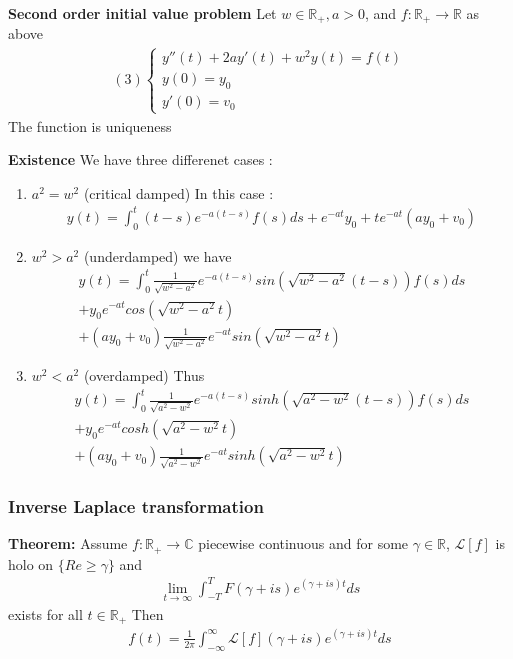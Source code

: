 \textbf{Second order initial value problem}
Let $w \in \mathbb{R}_+, a > 0$, and $f: \mathbb{R}_+ \rightarrow \mathbb{R}$ as above 
\begin{align*}
    (3)
    \begin{cases}
        y''(t) + 2ay'(t) + w^2y(t) = f(t) \\
        y(0) = y_0 \\
        y'(0) = v_0
    \end{cases}
\end{align*}
The function is uniqueness

\textbf{Existence}
We have three differenet cases : 
\begin{enumerate}
    \item $a^2 = w^2$ (critical damped) In this case :
    \begin{align*}
        y(t) = \int_0^t (t-s)e^{-a(t-s)}f(s)ds + e^{-at}y_0 + te^{-at}(ay_0 + v_0)
    \end{align*}
    \item $w^2 > a^2$ (underdamped) we have 
    \begin{align*}
        y(t) = \int_0^t \frac{1}{\sqrt{w^2-a^2}}e^{-a(t-s)}sin(\sqrt{w^2-a^2}(t-s))f(s)ds \\ +y_0 e^{-at}cos(\sqrt{w^2-a^2}t) \\ + (ay_0 + v_0)\frac{1}{\sqrt{w^2-a^2}}e^{-at}sin(\sqrt{w^2-a^2}t)
    \end{align*}
    \item $w^2 < a^2$ (overdamped) Thus 
    \begin{align*}
        y(t) = \int_0^t \frac{1}{\sqrt{a^2-w^2}}e^{-a(t-s)}sinh(\sqrt{a^2-w^2}(t-s))f(s)ds \\
        + y_0 e^{-at}cosh(\sqrt{a^2-w^2}t) \\
        + (ay_0 + v_0)\frac{1}{\sqrt{a^2-w^2}}e^{-at}sinh(\sqrt{a^2-w^2}t)
    \end{align*}
\end{enumerate}

\subsubsection{Inverse Laplace transformation}
\textbf{Theorem:} Assume $f:\mathbb{R}_+ \rightarrow \mathbb{C}$ piecewise continuous and for some $\gamma \in \mathbb{R}$, $\mathcal{L}[f]$ is holo on $\{Re \geq \gamma\}$ and 
\begin{align*}
    \lim_{t \rightarrow\infty}\int_{-T}^TF(\gamma + is)e^{(\gamma + is)t}ds
\end{align*}
exists for all $t\in \mathbb{R}_+$ Then 
\begin{align*}
    f(t) = \frac{1}{2 \pi}\int_{-\infty}^\infty \mathcal{L}[f](\gamma + is) e^{(\gamma + is)t}ds
\end{align*}